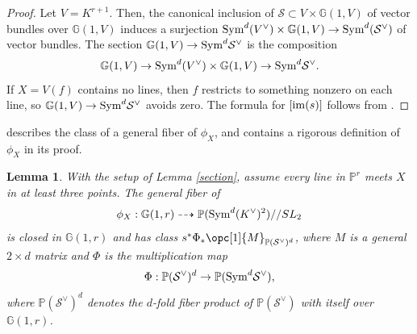 \documentclass[12pt]{amsart}
\newcommand{\mb}{\mathbb}
\newcommand{\mc}{\mathcal}
\newcommand{\im}{{\rm im}}
\theoremstyle{plain}
\newtheorem{Lem}[Thm]{Lemma}
\theoremstyle{definition}
\theoremstyle{remark}
\begin{document}
\begin{proof}
Let $V=K^{r+1}$. Then, the canonical inclusion of $\mc{S}\subset V\times \mb{G}(1,V)$ of vector bundles over $\mb{G}(1,V)$ induces a surjection ${\rm Sym}^d(V^\vee)\times \mb{G}(1,V)\to{\rm Sym}^d(\mc{S}^\vee)$ of vector bundles. The section $\mb{G}(1,V)\to {\rm Sym}^d\mc{S}^\vee$ is the composition 
\begin{align*}
\mb{G}(1,V)\to {\rm Sym}^d(V^\vee)\times \mb{G}(1,V)\to {\rm Sym}^d\mc{S}^\vee.
\end{align*}
If $X=V(f)$ contains no lines, then $f$ restricts to something nonzero on each line, so $\mb{G}(1,V)\to {\rm Sym}^d\mc{S}^\vee$ avoids zero. The formula for $[\im(s)]$ follows from \cite[Proposition 9.13]{3264}. 
\end{proof}

 describes the class of a general fiber of $\phi_X$, and contains a rigorous definition of $\phi_X$ in its proof.

\begin{Lem}
\label{IN}
With the setup of Lemma \ref{section}, assume every line in $\mb{P}^r$ meets $X$ in at least three points. The general fiber of
\begin{align*}
\phi_X : \mb{G}(1,r)\dashrightarrow \mb{P}({\rm Sym}^d (K^{\vee})^{2})//SL_{2}
\end{align*}
is closed in $\mb{G}(1,r)$ and has class $s^{*}\Phi_*\opc[1]{M}_{\mb{P}(\mc{S}^{\vee})^d}$, where $M$ is a general $2 \times d$ matrix and $\Phi$ is the multiplication map
\begin{align*}
\Phi:\mb{P}(\mc{S}^{\vee})^d\to \mb{P}({\rm Sym}^d \mc{S}^{\vee}), 
\end{align*}
where $\mb{P}(\mc{S}^{\vee})^d$ denotes the $d$-fold fiber product of $\mb{P}(\mc{S}^{\vee})$ with itself over $\mb{G}(1,r)$.
\end{Lem}
\end{document}
